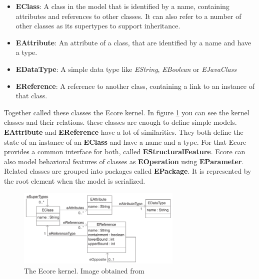 \documentclass[conference,onecolumn]{IEEEtran}
\begin{document}
    \begin{itemize}
      \item \textbf{EClass}: A class in the model that is identified by a name, containing attributes and references to other classes. It can also refer to a number of other classes as its supertypes to support inheritance.\cite{emf}
      \item \textbf{EAttribute}: An attribute of a class, that are identified by a name and have a type.\cite{emf}
      \item \textbf{EDataType}: A simple data type like \textit{EString}, \textit{EBoolean} or \textit{EJavaClass}\cite{emf}
      \item \textbf{EReference}: A reference to another class, containing a link to an instance of that class.\cite{emf}
    \end{itemize}


    Together \citeauthor{emf} called these classes the Ecore kernel. In figure \ref{fig:emf-kernel} you can see the kernel classes and their relations. these classes are enough to define simple models. \textbf{EAttribute} and \textbf{EReference} have a lot of similarities. They both define the state of an instance of an \textbf{EClass} and have a name and a type. For that Ecore provides a common interface for both, called \textbf{EStructuralFeature}. Ecore can also model behavioral features of classes as \textbf{EOperation} using \textbf{EParameter}.
    Related classes are grouped into packages called \textbf{EPackage}. It is represented by the root element when the model is serialized. \cite{emf}

    \begin{figure}[h]
      \centering
      \includegraphics[width=0.7\textwidth]{figures/emf-kernel}
      \caption{The Ecore kernel. Image obtained from \cite{emf}}
      \label{fig:emf-kernel}
    \end{figure}
\end{document}
